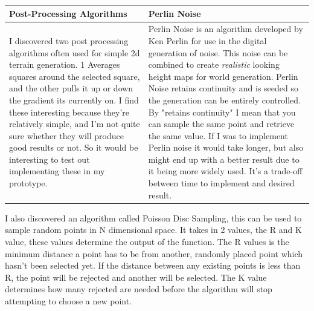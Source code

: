 \begin{flushleft}
                    \begin{center}
                        \begin{tabular}{| L{6cm} | L{6cm} |}
                            \hline
                            {\large Post-Processing Algorithms} & {\large Perlin Noise} \\
                            \hline
                            I discovered two post processing algorithms often used for simple 2d terrain generation. 1 Averages squares 
                            around the selected square, and the other pulls it up or down the gradient its currently on.
                            I find these interesting because they're relatively simple, and I'm not quite sure whether they will produce good results or not. 
                            So it would be interesting to test out implementing these in my prototype.
                            &
                            Perlin Noise is an algorithm developed by Ken Perlin for use in the digital generation of noise.
                            This noise can be combined to create \textit{realistic} looking height maps for world generation.
                            Perlin Noise retains continuity and is seeded so the generation can be entirely controlled.
                            By "retains continuity" I mean that you can sample the same point and retrieve the same value. 
                            If I was to implement Perlin noise it would take longer, but also might end up with a better result
                            due to it being more widely used. It's a trade-off between time to implement and desired result. \\
                            \hline
                        \end{tabular}
                    \end{center}
                    
                    I also discovered an algorithm called Poisson Disc Sampling, this can be used to sample random points 
                    in N dimensional space. It takes in 2 values, the R and K value, these values determine the output of
                    the function. The R values is the minimum distance a point has to be from another, randomly placed point
                    which hasn't been selected yet. If the distance between any existing points is less than R, the point
                    will be rejected and another will be selected. The K value determines how many rejected are needed before 
                    the algorithm will stop attempting to choose a new point.

\end{flushleft}
